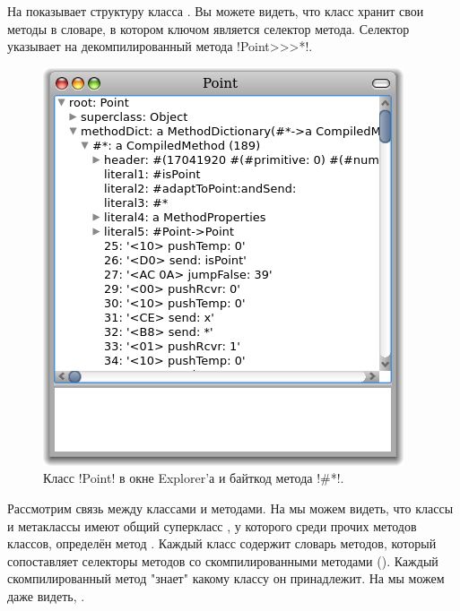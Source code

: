\documentclass[a4paper,10pt,twoside]{book}
\begin{document}
{%
На   показывает структуру класса .
Вы можете видеть, что класс хранит свои методы в словаре, в котором ключом является селектор метода.
Селектор \ct{#*} указывает на декомпилированный  метода \ct!Point>>>*!.

\begin{figure}[ht]\centering
	\includegraphics[width=.5\linewidth]{CompiledMethod}
	\caption{Класс \ct!Point! в окне Explorer'а и байткод метода \ct!\#*!.}
\end{figure}

Рассмотрим связь между классами и методами.
На  мы можем видеть, что классы и метаклассы имеют общий суперкласс , у которого среди прочих методов классов, определён метод .
Каждый класс содержит словарь методов, который сопоставляет селекторы методов со скомпилированными методами ().
Каждый скомпилированный метод "знает" какому классу он принадлежит.
На  мы можем даже видеть, .

}
\end{document}
